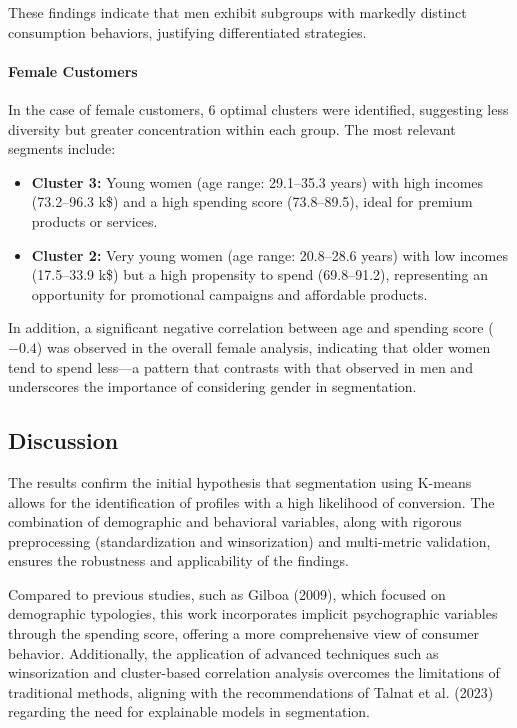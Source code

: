 \documentclass[10pt]{article}
\begin{document}
These findings indicate that men exhibit subgroups with markedly distinct consumption behaviors, justifying differentiated strategies.

\paragraph{Female Customers}

In the case of female customers, 6 optimal clusters were identified, suggesting less diversity but greater concentration within each group. The most relevant segments include:
\begin{itemize}
    \item \textbf{Cluster 3:} Young women (age range: 29.1--35.3 years) with high incomes (73.2--96.3 k\$) and a high spending score (73.8--89.5), ideal for premium products or services.
    \item \textbf{Cluster 2:} Very young women (age range: 20.8--28.6 years) with low incomes (17.5--33.9 k\$) but a high propensity to spend (69.8--91.2), representing an opportunity for promotional campaigns and affordable products.
\end{itemize}

In addition, a significant negative correlation between age and spending score (\(-0.4\)) was observed in the overall female analysis, indicating that older women tend to spend less—a pattern that contrasts with that observed in men and underscores the importance of considering gender in segmentation.

\subsection{Discussion}

The results confirm the initial hypothesis that segmentation using K-means allows for the identification of profiles with a high likelihood of conversion. The combination of demographic and behavioral variables, along with rigorous preprocessing (standardization and winsorization) and multi-metric validation, ensures the robustness and applicability of the findings.

Compared to previous studies, such as Gilboa (2009), which focused on demographic typologies, this work incorporates implicit psychographic variables through the spending score, offering a more comprehensive view of consumer behavior. Additionally, the application of advanced techniques such as winsorization and cluster-based correlation analysis overcomes the limitations of traditional methods, aligning with the recommendations of Talnat et al. (2023) regarding the need for explainable models in segmentation.
\end{document}
